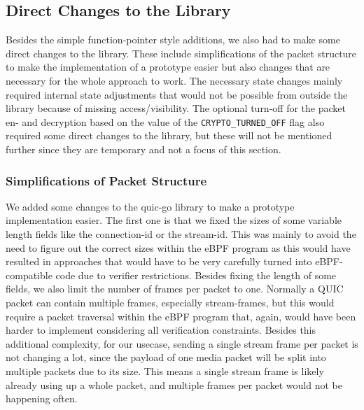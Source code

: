 \subsection{Direct Changes to the Library}

Besides the simple function-pointer style additions, we also had to make some direct changes to the library.
These include simplifications of the packet structure to make the implementation of a prototype easier 
but also changes that are necessary for the whole approach to work.
The necessary state changes mainly required internal state adjustments that would not be possible from outside 
the library because of missing access/visibility.
The optional turn-off for the packet en- and decryption based on the value of the \verb|CRYPTO_TURNED_OFF| flag
also required some direct changes to the library, but these will not be mentioned further since they are temporary
and not a focus of this section.

\subsubsection*{Simplifications of Packet Structure}
We added some changes to the quic-go library to make a prototype implementation easier.
The first one is that we fixed the sizes of some variable length fields like the connection-id or the stream-id.
This was mainly to avoid the need to figure out the correct sizes within the eBPF program as this would have 
resulted in approaches that would have to be very carefully turned into eBPF-compatible code due to verifier
restrictions.
Besides fixing the length of some fields, we also limit the number of frames per packet to one.
Normally a QUIC packet can contain multiple frames, especially stream-frames, but this would require 
a packet traversal within the eBPF program that, again, would have been harder to implement considering all
verification constraints.
Besides this additional complexity, for our usecase, sending a single stream frame per packet is not changing 
a lot, since the payload of one media packet will be split into multiple packets due to its size.
This means a single stream frame is likely already using up a whole packet, and multiple frames per packet would 
not be happening often.

